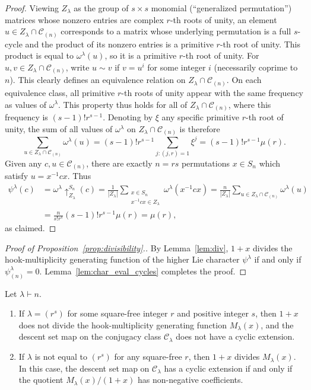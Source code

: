 \documentclass[ALCO,published]{cedram}
\newcommand{\C}{\mathcal C}
\begin{document}
\begin{proof}
    Viewing $Z_\lambda$ as the group of $s \times s$ monomial (``generalized permutation'') matrices whose nonzero entries are complex $r$-th roots of unity, an element $u \in Z_\lambda \cap \C_{(n)}$ corresponds to a matrix whose underlying permutation is a full $s$-cycle and the product of its nonzero entries is a primitive $r$-th root of unity.
    This product is equal to $\omega^\lambda(u)$, so it is a primitive $r$-th root of unity.
    For $u, v \in Z_\lambda \cap \C_{(n)}$, write $u \sim v$ if $v = u^i$ for some integer $i$ (necessarily coprime to $n$). This clearly defines an equivalence relation on $Z_\lambda \cap \C_{(n)}$. On each equivalence class, all primitive $r$-th roots of unity appear with the same frequency as values of $\omega^\lambda$. This property thus holds for all of $Z_\lambda \cap \C_{(n)}$, where this frequency is $(s-1)!r^{s-1}$. Denoting by $\xi$ any specific primitive $r$-th root of unity, the sum of all values of $\omega^\lambda$ on $Z_\lambda \cap \C_{(n)}$ is therefore
    \[
        \sum_{u\in Z_\lambda\cap\C_{(n)}} \omega^\lambda(u)
        = (s-1)! r^{s-1} \sum_{j:(j,r)=1} \xi^j
        = (s-1)! r^{s-1} \mu(r).
    \]
    Given any $c,u \in \C_{(n)}$, there are exactly $n=rs$ permutations $x \in S_n$ which satisfy $u=x^{-1}cx$.
    Thus
    \begin{align*}
        \psi^\lambda(c)
        &= \omega^\lambda\uparrow_{Z_\lambda}^{S_n}(c)
        = \frac{1}{|Z_\lambda|}\sum_{\substack{x \in S_n \\ x^{-1}cx \in Z_\lambda}} \omega^\lambda(x^{-1}cx)
        = \frac{n}{|Z_\lambda|}\sum_{u \in Z_\lambda\cap\C_{(n)}} \omega^\lambda(u) \\
        &= \frac{n}{s!r^s} (s-1)! r^{s-1} \mu(r)
        = \mu(r), 
    \end{align*}
    as claimed.
\end{proof}

\begin{proof}[Proof of Proposition~\ref{prop:divisibility}.]
	By Lemma~\ref{lem:div}, 
	$1+x$ divides the hook-multiplicity generating function of the higher Lie character $\psi^\lambda$ 
    if and only if $\psi^\lambda_{(n)}=0$.
    Lemma~\ref{lem:char_eval_cycles} completes the proof.
\end{proof}

\begin{corollary}\label{cor:only if}
    Let $\lambda \vdash n$.
    \begin{enumerate}
    \item
        If $\lambda = (r^s)$ for some square-free integer $r$ and positive integer $s$, then $1+x$ does not divide the hook-multiplicity generating function $M_\lambda(x)$, and the descent set map on the conjugacy class $\C_\lambda$ does not have a cyclic extension.
    \item 
        If $\lambda$ is not equal to $(r^s)$ for any square-free $r$, then $1+x$ divides $M_\lambda(x)$. 
        In this case, the descent set map on 
        $\C_\lambda$ has a cyclic extension if and only if 
        the quotient $M_\lambda(x)/(1+x)$ has non-negative coefficients.
    \end{enumerate}
\end{corollary}
\end{document}
